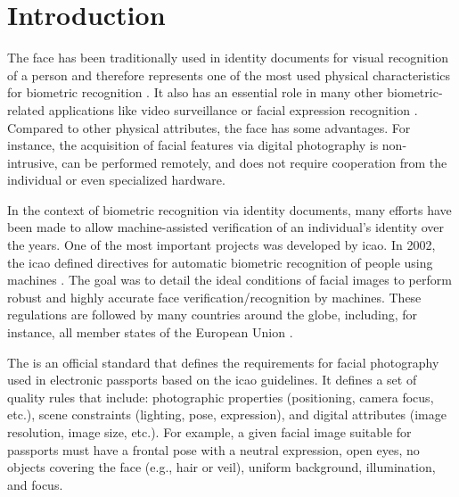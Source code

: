 \section{Introduction}

The face has been traditionally used in identity documents for visual recognition of a person and therefore represents one of the most used physical characteristics for biometric recognition \citep{ferrara2012face}. It also has an essential role in many other biometric-related applications like video surveillance \citep{de2015partially} or facial expression recognition \citep{anil2016literature}. Compared to other physical attributes, the face has some advantages. For instance, the acquisition of facial features via digital photography is non-intrusive, can be performed remotely, and does not require cooperation from the individual or even specialized hardware.


In the context of biometric recognition via identity documents, many efforts have been made to allow machine-assisted verification of an individual's identity over the years. One of the most important projects was developed by \acf{icao}. In 2002, the \acs{icao} defined directives for automatic biometric recognition of people using machines \citep{icao2003report}. The goal was to detail the ideal conditions of facial images to perform robust and highly accurate face verification/recognition by machines. These regulations are followed by many countries around the globe, including, for instance, all member states of the European Union \citep{ebinger2008international}.

The \icao \citep{iso-iec} is an official standard that defines the requirements for facial photography used in electronic passports based on the \acs{icao} guidelines. It defines a set of quality rules that include: photographic properties (positioning, camera focus, etc.), scene constraints (lighting, pose, expression), and digital attributes (image resolution, image size, etc.). For example, a given facial image suitable for passports must have a frontal pose with a neutral expression, open eyes, no objects covering the face (e.g., hair or veil), uniform background, illumination, and focus.

